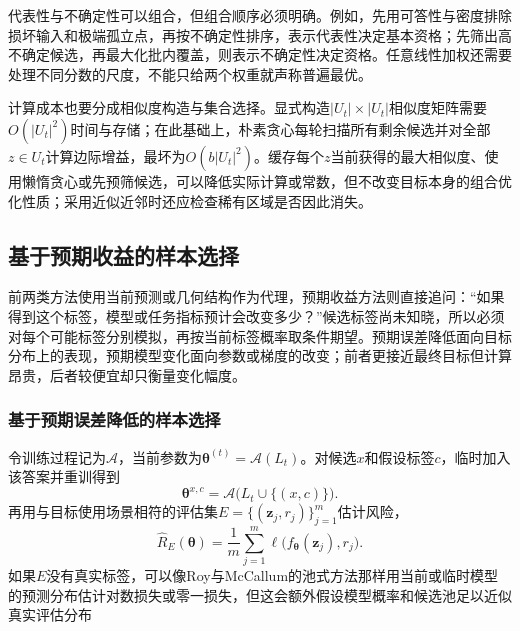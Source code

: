 代表性与不确定性可以组合，但组合顺序必须明确。例如，先用可答性与密度排除损坏输入和极端孤立点，再按不确定性排序，表示代表性决定基本资格；先筛出高不确定候选，再最大化批内覆盖，则表示不确定性决定资格。任意线性加权还需要处理不同分数的尺度，不能只给两个权重就声称普遍最优。

计算成本也要分成相似度构造与集合选择。显式构造$|U_t|\times|U_t|$相似度矩阵需要$O(|U_t|^2)$时间与存储；在此基础上，朴素贪心每轮扫描所有剩余候选并对全部$z\in U_t$计算边际增益，最坏为$O(b|U_t|^2)$。缓存每个$z$当前获得的最大相似度、使用懒惰贪心或先预筛候选，可以降低实际计算或常数，但不改变目标本身的组合优化性质；采用近似近邻时还应检查稀有区域是否因此消失。

\subsection{基于预期收益的样本选择}
\label{sec:knowledge-acquisition-human-expected-utility-selection}

前两类方法使用当前预测或几何结构作为代理，预期收益方法则直接追问：“如果得到这个标签，模型或任务指标预计会改变多少？”候选标签尚未知晓，所以必须对每个可能标签分别模拟，再按当前标签概率取条件期望。预期误差降低面向目标分布上的表现，预期模型变化面向参数或梯度的改变；前者更接近最终目标但计算昂贵，后者较便宜却只衡量变化幅度。

\subsubsection{基于预期误差降低的样本选择}
\label{sec:knowledge-acquisition-human-expected-error-reduction}

令训练过程记为$\mathcal{A}$，当前参数为$\bm{\theta}^{(t)}=\mathcal{A}(L_t)$。对候选$x$和假设标签$c$，临时加入该答案并重训得到
\begin{equation}
  \bm{\theta}^{x,c}
  =\mathcal{A}\bigl(L_t\cup\{(x,c)\}\bigr).
  \label{eq:knowledge-acquisition-human-hypothetical-update}
\end{equation}
再用与目标使用场景相符的评估集$E=\{(\bm{z}_j,r_j)\}_{j=1}^{m}$估计风险，
\begin{equation}
  \widehat R_E(\bm{\theta})
  =\frac{1}{m}\sum_{j=1}^{m}
  \ell\bigl(f_{\bm{\theta}}(\bm{z}_j),r_j\bigr).
  \label{eq:knowledge-acquisition-human-evaluation-risk}
\end{equation}
如果$E$没有真实标签，可以像Roy与McCallum的池式方法那样用当前或临时模型的预测分布估计对数损失或零一损失，但这会额外假设模型概率和候选池足以近似真实评估分布

